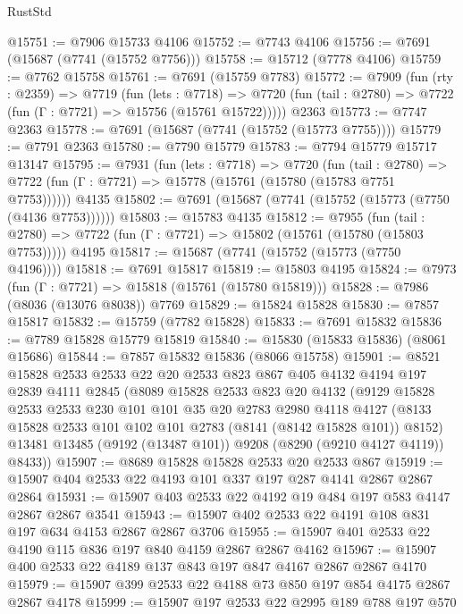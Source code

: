 \begin{lexlean}{RustStd}
\begin{coremodule}
@15751 := @7906 @15733 @4106
@15752 := @7743 @4106
@15756 := @7691 (@15687 (@7741 (@15752 @7756)))
@15758 := @15712 (@7778 @4106)
@15759 := @7762 @15758
@15761 := @7691 (@15759 @7783)
@15772 := @7909
    (fun (rty : @2359) =>
    @7719
      (fun (lets : @7718) =>
      @7720 (fun (tail : @2780) => @7722 (fun (Γ : @7721) => @15756 (@15761 @15722)))))
    @2363
@15773 := @7747 @2363
@15778 := @7691 (@15687 (@7741 (@15752 (@15773 @7755))))
@15779 := @7791 @2363
@15780 := @7790 @15779
@15783 := @7794 @15779 @15717 @13147
@15795 := @7931
    (fun (lets : @7718) =>
    @7720
      (fun (tail : @2780) =>
      @7722 (fun (Γ : @7721) => @15778 (@15761 (@15780 (@15783 @7751 @7753))))))
    @4135
@15802 := @7691 (@15687 (@7741 (@15752 (@15773 (@7750 (@4136 @7753))))))
@15803 := @15783 @4135
@15812 := @7955
    (fun (tail : @2780) => @7722 (fun (Γ : @7721) => @15802 (@15761 (@15780 (@15803 @7753)))))
    @4195
@15817 := @15687 (@7741 (@15752 (@15773 (@7750 @4196))))
@15818 := @7691 @15817
@15819 := @15803 @4195
@15824 := @7973 (fun (Γ : @7721) => @15818 (@15761 (@15780 @15819)))
@15828 := @7986 (@8036 (@13076 @8038)) @7769
@15829 := @15824 @15828
@15830 := @7857 @15817
@15832 := @15759 (@7782 @15828)
@15833 := @7691 @15832
@15836 := @7789 @15828 @15779 @15819
@15840 := @15830 (@15833 @15836) (@8061 @15686)
@15844 := @7857 @15832 @15836 (@8066 @15758)
@15901 := @8521
    @15828
    @2533
    @2533
    @22
    @20
    @2533
    @823
    @867
    @405
    @4132
    @4194
    @197
    @2839
    @4111
    @2845
    (@8089
      @15828
      @2533
      @823
      @20
      @4132
      (@9129
        @15828
        @2533
        @2533
        @230
        @101
        @101
        @35
        @20
        @2783
        @2980
        @4118
        @4127
        (@8133 @15828 @2533 @101 @102 @101 @2783 (@8141 (@8142 @15828 @101)) @8152)
        @13481
        @13485
        (@9192 (@13487 @101))
        @9208
        (@8290 (@9210 @4127 @4119))
        @8433))
@15907 := @8689 @15828 @15828 @2533 @20 @2533 @867
@15919 := @15907 @404 @2533 @22 @4193 @101 @337 @197 @287 @4141 @2867 @2867 @2864
@15931 := @15907 @403 @2533 @22 @4192 @19 @484 @197 @583 @4147 @2867 @2867 @3541
@15943 := @15907 @402 @2533 @22 @4191 @108 @831 @197 @634 @4153 @2867 @2867 @3706
@15955 := @15907 @401 @2533 @22 @4190 @115 @836 @197 @840 @4159 @2867 @2867 @4162
@15967 := @15907 @400 @2533 @22 @4189 @137 @843 @197 @847 @4167 @2867 @2867 @4170
@15979 := @15907 @399 @2533 @22 @4188 @73 @850 @197 @854 @4175 @2867 @2867 @4178
@15999 := @15907
    @197
    @2533
    @22
    @2995
    @189
    @788
    @197
    @570

\end{coremodule}
\end{lexlean}
